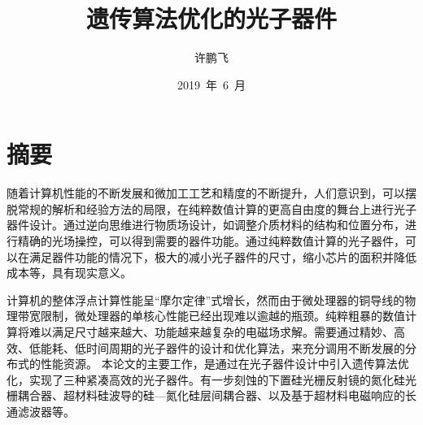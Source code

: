 \confidential{}%
\title{遗传算法优化的光子器件}%
\author{许鹏飞}%
\advisors{}%
\date{2019~年~6~月}%
\maketitle%
\MAKETITLE%
\makedeclaration%
\intobmk\chapter*{摘\quad 要}%
\setcounter{page}{1}%

随着计算机性能的不断发展和微加工工艺和精度的不断提升，人们意识到，可以摆脱常规的解析和经验方法的局限，在纯粹数值计算的更高自由度的舞台上进行光子器件设计。通过逆向思维进行物质场设计，如调整介质材料的结构和位置分布，进行精确的光场操控，可以得到需要的器件功能。通过纯粹数值计算的光子器件，可以在满足器件功能的情况下，极大的减小光子器件的尺寸，缩小芯片的面积并降低成本等，具有现实意义。

计算机的整体浮点计算性能呈“摩尔定律”式增长，然而由于微处理器的铜导线的物理带宽限制，微处理器的单核心性能已经出现难以逾越的瓶颈。纯粹粗暴的数值计算将难以满足尺寸越来越大、功能越来越复杂的电磁场求解。需要通过精妙、高效、低能耗、低时间周期的光子器件的设计和优化算法，来充分调用不断发展的分布式的性能资源。
本论文的主要工作，是通过在光子器件设计中引入遗传算法优化，实现了三种紧凑高效的光子器件。有一步刻蚀的下置硅光栅反射镜的氮化硅光栅耦合器、超材料硅波导的硅—氮化硅层间耦合器、以及基于超材料电磁响应的长通滤波器等。

